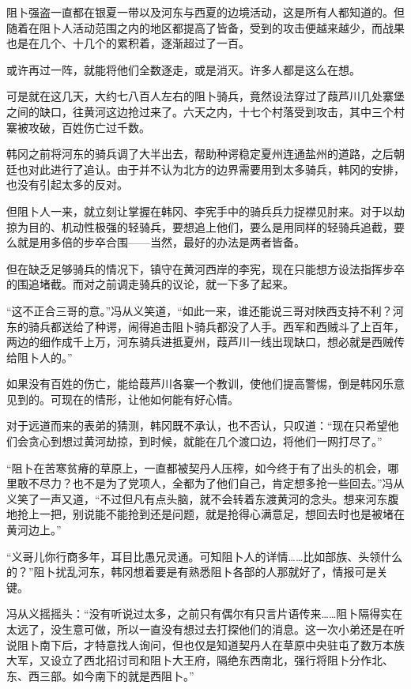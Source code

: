 阻卜强盗一直都在银夏一带以及河东与西夏的边境活动，这是所有人都知道的。但随着在阻卜人活动范围之内的地区都提高了皆备，受到的攻击便越来越少，而战果也是在几个、十几个的累积着，逐渐超过了一百。

或许再过一阵，就能将他们全数逐走，或是消灭。许多人都是这么在想。

可是就在这几天，大约七八百人左右的阻卜骑兵，竟然设法穿过了葭芦川几处寨堡之间的缺口，往黄河这边抢过来了。六天之内，十七个村落受到攻击，其中三个村寨被攻破，百姓伤亡过千数。

韩冈之前将河东的骑兵调了大半出去，帮助种谔稳定夏州连通盐州的道路，之后朝廷也对此进行了追认。由于并不认为北方的边界需要用到太多骑兵，韩冈的安排，也没有引起太多的反对。

但阻卜人一来，就立刻让掌握在韩冈、李宪手中的骑兵兵力捉襟见肘来。对于以劫掠为目的、机动性极强的轻骑兵，要想追上他们，要么是用同样的轻骑兵追截，要么就是用多倍的步卒合围——当然，最好的办法是两者皆备。

但在缺乏足够骑兵的情况下，镇守在黄河西岸的李宪，现在只能想方设法指挥步卒的围追堵截。而对之前调走骑兵的议论，就一下多了起来。

“这不正合三哥的意。”冯从义笑道，“如此一来，谁还能说三哥对陕西支持不利？河东的骑兵都送给了种谔，闹得追击阻卜骑兵都没了人手。西军和西贼斗了上百年，两边的细作成千上万，河东骑兵进抵夏州，葭芦川一线出现缺口，想必就是西贼传给阻卜人的。”

如果没有百姓的伤亡，能给葭芦川各寨一个教训，使他们提高警惕，倒是韩冈乐意见到的。可现在的情形，让他如何能有好心情。

对于远道而来的表弟的猜测，韩冈既不承认，也不否认，只叹道：“现在只希望他们会贪心到想过黄河劫掠，到时候，就能在几个渡口边，将他们一网打尽了。”

“阻卜在苦寒贫瘠的草原上，一直都被契丹人压榨，如今终于有了出头的机会，哪里敢不尽力？也不是为了党项人，全都为了他们自己，肯定想多抢一些回去。”冯从义笑了一声又道，“不过但凡有点头脑，就不会转着东渡黄河的念头。想来河东腹地抢上一把，别说能不能抢到还是问题，就是抢得心满意足，想回去时也是被堵在黄河边上。”

“义哥儿你行商多年，耳目比愚兄灵通。可知阻卜人的详情……比如部族、头领什么的？”阻卜扰乱河东，韩冈想着要是有熟悉阻卜各部的人那就好了，情报可是关键。

冯从义摇摇头：“没有听说过太多，之前只有偶尔有只言片语传来……阻卜隔得实在太远了，没生意可做，所以一直没有想过去打探他们的消息。这一次小弟还是在听说阻卜南下后，才特意找人询问，但也仅是知道契丹人在草原中央驻屯了数万本族大军，又设立了西北招讨司和阻卜大王府，隔绝东西南北，强行将阻卜分作北、东、西三部。如今南下的就是西阻卜。”

